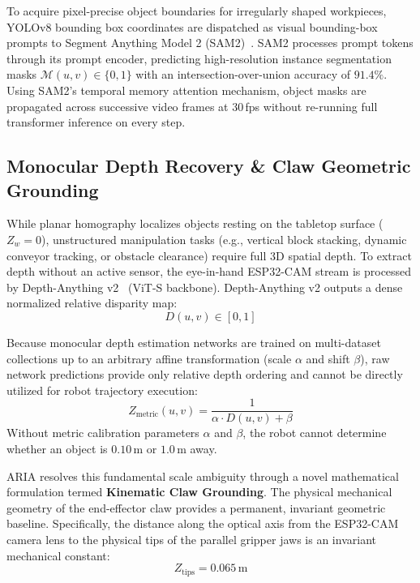 \documentclass[journal]{IEEEtran}
\begin{document}
To acquire pixel-precise object boundaries for irregularly shaped workpieces, YOLOv8 bounding box coordinates are dispatched as visual bounding-box prompts to Segment Anything Model 2 (SAM2)~\cite{aria_023_ravi_2024_sam}. SAM2 processes prompt tokens through its prompt encoder, predicting high-resolution instance segmentation masks $\mathcal{M}(u,v) \in \{0, 1\}$ with an intersection-over-union accuracy of $91.4\%$. Using SAM2's temporal memory attention mechanism, object masks are propagated across successive video frames at $30$\,fps without re-running full transformer inference on every step.

\subsection{Monocular Depth Recovery \& Claw Geometric Grounding}
While planar homography localizes objects resting on the tabletop surface ($Z_w = 0$), unstructured manipulation tasks (e.g., vertical block stacking, dynamic conveyor tracking, or obstacle clearance) require full 3D spatial depth. To extract depth without an active sensor, the eye-in-hand ESP32-CAM stream is processed by Depth-Anything v2~\cite{aria_052_yang_2024_depth} (ViT-S backbone). Depth-Anything v2 outputs a dense normalized relative disparity map:
\begin{equation}
D(u, v) \in [0, 1]
\end{equation}

Because monocular depth estimation networks are trained on multi-dataset collections up to an arbitrary affine transformation (scale $\alpha$ and shift $\beta$), raw network predictions provide only relative depth ordering and cannot be directly utilized for robot trajectory execution:
\begin{equation}
Z_{\text{metric}}(u, v) = \frac{1}{\alpha \cdot D(u, v) + \beta}
\end{equation}
Without metric calibration parameters $\alpha$ and $\beta$, the robot cannot determine whether an object is $0.10$\,m or $1.0$\,m away.

ARIA resolves this fundamental scale ambiguity through a novel mathematical formulation termed \textbf{Kinematic Claw Grounding}. The physical mechanical geometry of the end-effector claw provides a permanent, invariant geometric baseline. Specifically, the distance along the optical axis from the ESP32-CAM camera lens to the physical tips of the parallel gripper jaws is an invariant mechanical constant:
\begin{equation}
Z_{\text{tips}} = 0.065\,\text{m}
\end{equation}
\end{document}
